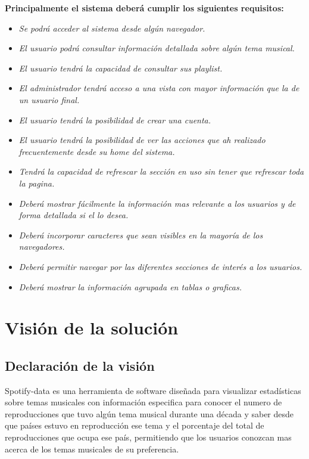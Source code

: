 \documentclass[12pt,a4paper]{book}
\begin{document}
\textbf{Principalmente el sistema deberá cumplir los siguientes requisitos: }
\vspace{0.5 cm}
\begin{itemize}
\item \textit{Se podrá acceder al sistema desde algún navegador.}
\item \textit{El usuario podrá consultar información detallada sobre algún tema musical.}
\item \textit{El usuario tendrá la capacidad de consultar sus playlist.}
\item \textit{El administrador tendrá acceso a una vista con mayor información que la de un usuario final.}
\item \textit{El usuario tendrá la posibilidad de crear una cuenta.}
\item \textit{El usuario tendrá la posibilidad de ver las acciones que ah realizado frecuentemente desde su home del sistema.}
\item \textit{Tendrá la capacidad de refrescar la sección en uso sin tener que refrescar toda la pagina.}
\item \textit{Deberá mostrar fácilmente la información mas relevante a los usuarios y de forma detallada si el lo desea.}
\item \textit{Deberá incorporar caracteres que sean visibles en la mayoría de los navegadores.}
\item \textit{Deberá permitir navegar por las diferentes secciones de interés a los usuarios.}
\item \textit{Deberá mostrar la información agrupada en tablas o graficas.}
\end{itemize}

\chapter{Visión de la solución}

\section{Declaración de la visión}
\vspace{0.5 cm}
Spotify-data es una herramienta de software diseñada para visualizar estadísticas sobre temas musicales con información especifica para conocer el numero de reproducciones que tuvo algún tema musical durante una década y saber desde que países estuvo en reproducción ese tema y el porcentaje del total de reproducciones que ocupa ese país, permitiendo que los usuarios conozcan mas acerca de los temas musicales de su preferencia.
\end{document}
